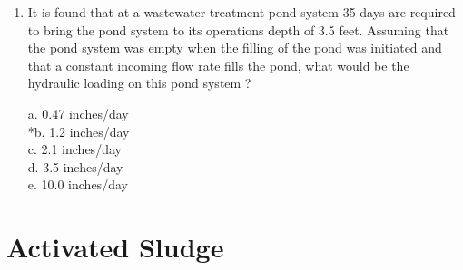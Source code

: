 \begin{enumerate}
\item  It is found that at a wastewater treatment pond system 35 days are required to bring the pond system to its operations depth of 3.5 feet. Assuming that the pond system was empty when the filling of the pond was initiated and that a constant incoming flow rate fills the pond, what would be the hydraulic loading on this pond system ? 

a. 0.47 inches/day \\
*b. 1.2 inches/day \\
c. 2.1 inches/day \\
d. 3.5 inches/day \\
e. 10.0 inches/day

\end{enumerate}

\section*{Activated Sludge}

